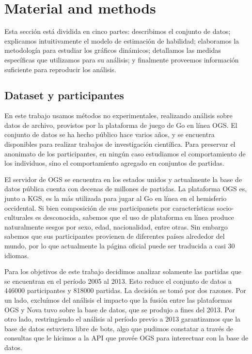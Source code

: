 \documentclass[a4paper,11pt]{book}
\theoremstyle{definition}
\begin{document}
\section{Material and methods}

Esta sección está dividida en cinco partes: describimos el conjunto de datos; explicamos intuitivamente el modelo de estimación de habilidad; elaboramos la metodología para estudiar los gráficos dinámicos; detallamos las medidas específicas que utilizamos para su análisis; y finalmente proveemos información suficiente para reproducir los análisis.

\subsection{Dataset y participantes}

En este trabajo usamos métodos no experimentales, realizando análisis sobre datos de archivo, provistos por la plataforma de juego de Go en línea OGS.
%
El conjunto de datos se ha hecho público hace varios años, y se encuentra disponibles para realizar trabajos de investigación científica.
%
Para preservar el anonimato de los participantes, en ningún caso estudiamos el comportamiento de los individuos, sino el comportamiento agregado en conjuntos de partidas.


El servidor de OGS se encuentra en los estados unidos y actualmente la base de datos pública cuenta con decenas de millones de partidas.
%
La plataforma OGS es, junto a KGS, es la más utilizada para jugar al Go en línea en el hemisferio occidental.
%
Si bien composición de sus participanets por características socio-culturales es desconocida, sabemos que el uso de plataforma en línea produce naturalmente sesgos por sexo, edad, nacionalidad, entre otras.
%
Sin embargo sabemos que sus participantes provienen de diferentes países alrededor del mundo, por lo que actualmente la página oficial puede ser traducida a casi 30 idiomas.


Para los objetivos de este trabajo decidimos analizar solamente las partidas que se encuentran en el período 2005 al 2013.
%
Esto reduce el conjunto de datos a 446000 participantes y 818000 partidas.
%
La decisión se tomó por dos razones.
%
Por un lado, excluímos del análisis el impacto que la fusión entre las plataformas OGS y Nova tuvo sobre la base de datos, que se produjo a fines del 2013.
%
Por otro lado, restringiendo el análisis al período previo a 2013 garantizamos que la base de datos estuviera libre de bots, algo que pudimos constatar a través de consultas que le hicimos a la API que provée OGS para interectuar con la base de datos.
\end{document}
